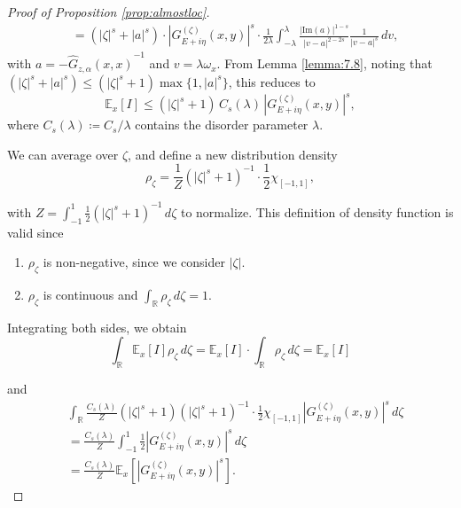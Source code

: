 \documentclass[11pt, a4paper, UKenglish, oneside]{book}
\theoremstyle{plain}
\theoremstyle{remark}
\theoremstyle{definition}
\numberwithin{equation}{section}
\numberwithin{theorem}{section}
\begin{document}
\begin{proof}[Proof of Proposition \ref{prop:almostloc}]
\begin{align*}
        &= (|\zeta|^s + |a|^s) \cdot |G_{E+i\eta}^{(\zeta)}(x,y)|^s \cdot \frac{1}{2 \lambda} \int_{-\lambda}^{\lambda} \frac{|\mathrm{Im}(a)|^{1-s}}{|v - a|^{2-2s}} \frac{1}{|v-a|^s} \, dv,
    \end{align*}
    with $a = -{\hat{G}_{z,\alpha}(x,x)}^{-1}$ and $v=\lambda \omega_x$.
    From Lemma \ref{lemma:7.8}, noting that $(|\zeta|^s + |a|^s) \le (|\zeta|^s + 1) \max\{1, |a|^s\}$, this reduces to
    \begin{equation*}
        \mathbb{E}_x [I] \le (|\zeta|^s + 1)\, C_s(\lambda)\, |G_{E+i\eta}^{(\zeta)}(x,y)|^s,
    \end{equation*}
    where $C_s(\lambda) \coloneqq C_s / \lambda$ contains the disorder parameter $\lambda$.

    We can average over $\zeta$, and define a new distribution density
    \begin{equation*}
        \rho_\zeta = \frac{1}{Z} (|\zeta|^s + 1)^{-1} \cdot \frac{1}{2} \chi_{[-1,1]},
    \end{equation*}

    with $Z = \int_{-1}^{1} \frac{1}{2} (|\zeta|^s + 1)^{-1} \, d\zeta$ to normalize. This definition of density function is valid since
    \begin{enumerate}
        \item[(a)] $\rho_\zeta$ is non-negative, since we consider $|\zeta|$.
        \item[(b)] $\rho_\zeta$ is continuous and $\int_{\mathbb{R}} \rho_\zeta \, d\zeta = 1$.
    \end{enumerate}

    Integrating both sides, we obtain
    \begin{equation*}
    \int_{\mathbb{R}} \mathbb{E}_x [I] \rho_\zeta \, d\zeta = \mathbb{E}_x [I] \cdot \int_{\mathbb{R}} \rho_\zeta \, d\zeta = \mathbb{E}_x [I]
    \end{equation*}

    and
    \begin{align*}
    &\int_{\mathbb{R}} \frac{C_s(\lambda)}{Z} (|\zeta|^s + 1) (|\zeta|^s + 1)^{-1} \cdot \frac{1}{2} \chi_{[-1,1]} |G_{E+i\eta}^{(\zeta)}(x,y)|^s \, d\zeta \\
    &= \frac{C_s(\lambda)}{Z} \int_{-1}^{1} \frac{1}{2} |G_{E+i\eta}^{(\zeta)}(x,y)|^s \, d\zeta \\
    &= \frac{C_s(\lambda)}{Z} \mathbb{E}_x \left[ |G_{E+i\eta}^{(\zeta)}(x,y)|^s \right].
    \end{align*}


\end{proof}
\end{document}
